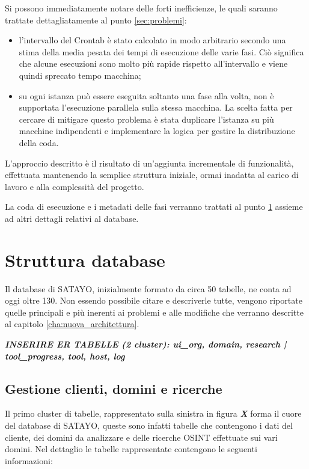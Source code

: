 Si possono immediatamente notare delle forti inefficienze, le quali saranno trattate
dettagliatamente al punto \ref{sec:problemi}:

\begin{itemize}
  \item l'intervallo del Crontab è stato calcolato in modo arbitrario secondo una
    stima della media pesata dei tempi di esecuzione delle varie fasi. Ciò
    significa che alcune esecuzioni sono molto più rapide rispetto all'intervallo
    e viene quindi sprecato tempo macchina;

  \item su ogni istanza può essere eseguita soltanto una fase alla volta, non è
    supportata l'esecuzione parallela sulla stessa macchina. La scelta fatta per
    cercare di mitigare questo problema è stata duplicare l'istanza su più macchine
    indipendenti e implementare la logica per gestire la distribuzione della coda.
\end{itemize}

L'approccio descritto è il risultato di un'aggiunta incrementale di funzionalità,
effettuata mantenendo la semplice struttura iniziale, ormai inadatta al carico
di lavoro e alla complessità del progetto.

La coda di esecuzione e i metadati delle fasi verranno trattati al punto
\ref{sec:database} assieme ad altri dettagli relativi al database.

\section{Struttura database}
\label{sec:database}

Il database di SATAYO, inizialmente formato da circa 50 tabelle, ne conta ad oggi
oltre 130. Non essendo possibile citare e descriverle tutte, vengono riportate
quelle principali e più inerenti ai problemi e alle modifiche che verranno
descritte al capitolo \ref{cha:nuova_architettura}.

\textbf{\textit{INSERIRE ER TABELLE (2 cluster): ui\_org, domain, research | tool\_progress,
tool, host, log}}

\subsection{Gestione clienti, domini e ricerche}
\label{sub:db:mgmt}

Il primo cluster di tabelle, rappresentato sulla sinistra in figura \textbf{\textit{X}}
forma il cuore del database di SATAYO, queste sono infatti tabelle che
contengono i dati del cliente, dei domini da analizzare e delle ricerche OSINT effettuate
sui vari domini. Nel dettaglio le tabelle rappresentate contengono le seguenti
informazioni:

